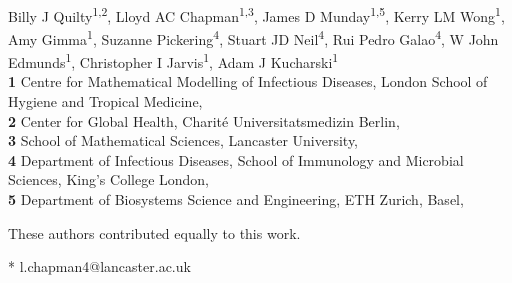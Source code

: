 \documentclass[
  10pt,
  letterpaper,
]{article}
\begin{document}
\vspace*{0.2in}

\begin{flushleft}
{\Large
\textbf{} %
}
\newline
\\
Billy J Quilty\textsuperscript{1,2\Yinyang}, Lloyd AC
Chapman\textsuperscript{1,3\Yinyang*}, James D
Munday\textsuperscript{1,5}, Kerry LM Wong\textsuperscript{1}, Amy
Gimma\textsuperscript{1}, Suzanne Pickering\textsuperscript{4}, Stuart
JD Neil\textsuperscript{4}, Rui Pedro Galao\textsuperscript{4}, W John
Edmunds\textsuperscript{1}, Christopher I
Jarvis\textsuperscript{1}, Adam J Kucharski\textsuperscript{1}
\\
\bigskip
\textbf{1} Centre for Mathematical Modelling of Infectious Diseases,
London School of Hygiene and Tropical Medicine, \\ \textbf{2} Center for
Global Health, Charité Universitatsmedizin Berlin, \\ \textbf{3} School
of Mathematical Sciences, Lancaster University, \\ \textbf{4} Department
of Infectious Diseases, School of Immunology and Microbial Sciences,
King's College London, \\ \textbf{5} Department of Biosystems Science
and Engineering, ETH Zurich, Basel, 
\bigskip

% 
%
\Yinyang These authors contributed equally to this work.





* l.chapman4@lancaster.ac.uk

\end{flushleft}
\end{document}
